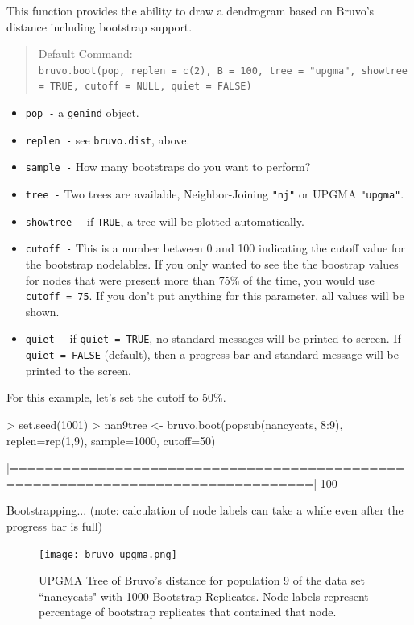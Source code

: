\documentclass[letterpaper]{article}
\newcommand{\tab}{\hspace*{1em}}
\begin{document}
\tab\tab This function provides the ability to draw a dendrogram based on Bruvo's distance including bootstrap support. 
\begin{quote}
Default Command:\\
\texttt{bruvo.boot(pop, replen = c(2), B = 100, tree = "upgma", showtree = TRUE, cutoff = NULL, quiet = FALSE)}
\end{quote}
\begin{itemize}
  \item \texttt{pop -} a \texttt{genind} object.
  \item \texttt{replen -} see \texttt{bruvo.dist}, above.
  \item \texttt{sample -} How many bootstraps do you want to perform? 
  \item \texttt{tree -} Two trees are available, Neighbor-Joining \texttt{"nj"} or UPGMA \texttt{"upgma"}.
  \item \texttt{showtree -} if \texttt{TRUE}, a tree will be plotted automatically.
  \item \texttt{cutoff -} This is a number between 0 and 100 indicating the cutoff value for the bootstrap nodelables. If you only wanted to see the the boostrap values for nodes that were present more than 75\% of the time, you would use \texttt{cutoff = 75}. If you don't put anything for this parameter, all values will be shown.
  \item \texttt{quiet -} if \texttt{quiet = TRUE}, no standard messages will be printed to screen. If \texttt{quiet = FALSE} (default), then a progress bar and standard message will be printed to the screen.
\end{itemize}

For this example, let's set the cutoff to 50\%.
\begin{Schunk}
\begin{Sinput}
> set.seed(1001)
> nan9tree <- bruvo.boot(popsub(nancycats, 8:9), replen=rep(1,9), sample=1000, cutoff=50)
\end{Sinput}
\end{Schunk}
\begin{Schunk}
\begin{Soutput}
|================================================================================| 100%
\end{Soutput}
\begin{Soutput}
Bootstrapping... (note: calculation of node labels can take a while even after the progress bar is full)
\end{Soutput}
\end{Schunk}
\begin{figure}[h!]
  \centering
  \caption{\footnotesize UPGMA Tree of Bruvo's distance for population 9 of the data set ``nancycats" with 1000 Bootstrap Replicates. Node labels represent percentage of bootstrap replicates that contained that node.}
  \label{bruvo_upgma}
  \texttt{[image: bruvo\_upgma.png]}


\end{figure}
\end{document}
